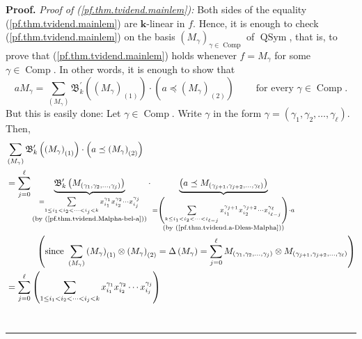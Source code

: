 \documentclass[numbers=enddot,12pt,final,onecolumn,notitlepage,abstracton]{scrartcl}%
\theoremstyle{definition}
\newenvironment{proof}[1][Proof]{\noindent\textbf{#1.} }{\ \rule{0.5em}{0.5em}}
\newenvironment{verlong}{}{}
\let\sumnonlimits\sum
\renewcommand{\sum}{\sumnonlimits\limits}
\begin{document}
\begin{verlong}
\begin{proof}
\textit{Proof of (\ref{pf.thm.tvidend.mainlem}):} Both sides of the equality
(\ref{pf.thm.tvidend.mainlem}) are $\mathbf{k}$-linear in $f$. Hence, it is
enough to check (\ref{pf.thm.tvidend.mainlem}) on the basis $\left(
M_{\gamma}\right)  _{\gamma\in\operatorname*{Comp}}$ of $\operatorname*{QSym}%
$, that is, to prove that (\ref{pf.thm.tvidend.mainlem}) holds whenever
$f=M_{\gamma}$ for some $\gamma\in\operatorname*{Comp}$. In other words, it is
enough to show that
\[
aM_{\gamma}=\sum_{\left(  M_{\gamma}\right)  }\mathfrak{B}_{k}^{\prime}\left(
\left(  M_{\gamma}\right)  _{\left(  1\right)  }\right)  \cdot\left(  a\left.
\preceq\right.  \left(  M_{\gamma}\right)  _{\left(  2\right)  }\right)
\ \ \ \ \ \ \ \ \ \ \text{for every }\gamma\in\operatorname*{Comp}.
\]
But this is easily done: Let $\gamma\in\operatorname*{Comp}$. Write $\gamma$
in the form $\gamma=\left(  \gamma_{1},\gamma_{2},\ldots,\gamma_{\ell}\right)
$. Then,%
\begin{align*}
&  \sum_{\left(  M_{\gamma}\right)  }\mathfrak{B}_{k}^{\prime}\left(  \left(
M_{\gamma}\right)  _{\left(  1\right)  }\right)  \cdot\left(  a\left.
\preceq\right.  \left(  M_{\gamma}\right)  _{\left(  2\right)  }\right) \\
&  =\sum_{j=0}^{\ell}\underbrace{\mathfrak{B}_{k}^{\prime}\left(  M_{\left(
\gamma_{1},\gamma_{2},\ldots,\gamma_{j}\right)  }\right)  }_{\substack{=\sum
_{1\leq i_{1}<i_{2}<\cdots<i_{j}<k}x_{i_{1}}^{\gamma_{1}}x_{i_{2}}^{\gamma
_{2}}\cdots x_{i_{j}}^{\gamma_{j}}\\\text{(by
(\ref{pf.thm.tvidend.Malpha-bel-a}))}}}\cdot\underbrace{\left(  a\left.
\preceq\right.  M_{\left(  \gamma_{j+1},\gamma_{j+2},\ldots,\gamma_{\ell
}\right)  }\right)  }_{\substack{=\left(  \sum_{k\leq i_{1}<i_{2}%
<\cdots<i_{\ell-j}}x_{i_{1}}^{\gamma_{j+1}}x_{i_{2}}^{\gamma_{j+2}}\cdots
x_{i_{\ell-j}}^{\gamma_{\ell}}\right)  \cdot a\\\text{(by
(\ref{pf.thm.tvidend.a-Dless-Malpha}))}}}\\
&  \ \ \ \ \ \ \ \ \ \ \left(  \text{since }\sum_{\left(  M_{\gamma}\right)
}\left(  M_{\gamma}\right)  _{\left(  1\right)  }\otimes\left(  M_{\gamma
}\right)  _{\left(  2\right)  }=\Delta\left(  M_{\gamma}\right)  =\sum
_{j=0}^{\ell}M_{\left(  \gamma_{1},\gamma_{2},\ldots,\gamma_{j}\right)
}\otimes M_{\left(  \gamma_{j+1},\gamma_{j+2},\ldots,\gamma_{\ell}\right)
}\right) \\
&  =\sum_{j=0}^{\ell}\left(  \sum_{1\leq i_{1}<i_{2}<\cdots<i_{j}<k}x_{i_{1}%
}^{\gamma_{1}}x_{i_{2}}^{\gamma_{2}}\cdots x_{i_{j}}^{\gamma_{j}}\right)

\end{align*}
\end{proof}
\end{verlong}
\end{document}
